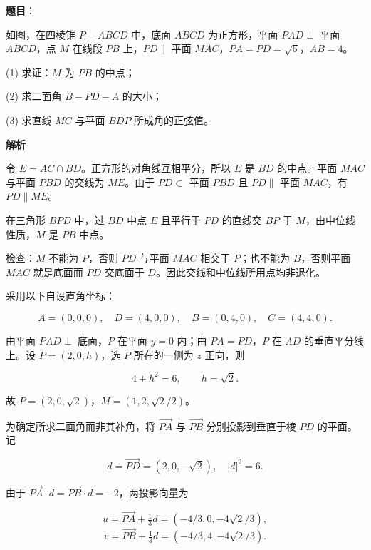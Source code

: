 \begin{answer}

\textbf{题目}：

如图，在四棱锥 $P-ABCD$ 中，底面 $ABCD$ 为正方形，平面 $PAD\perp$ 平面 $ABCD$，点 $M$ 在线段 $PB$ 上，$PD\parallel$ 平面 $MAC$，$PA=PD=\sqrt6$，$AB=4$。

(1) 求证：$M$ 为 $PB$ 的中点；

(2) 求二面角 $B-PD-A$ 的大小；

(3) 求直线 $MC$ 与平面 $BDP$ 所成角的正弦值。
\nopagebreak[4]
\begin{center}\end{center}
\nopagebreak[4]
\textbf{解析}


令 $E=AC\cap BD$。正方形的对角线互相平分，所以 $E$ 是 $BD$ 的中点。平面 $MAC$ 与平面 $PBD$ 的交线为 $ME$。由于 $PD\subset$ 平面 $PBD$ 且 $PD\parallel$ 平面 $MAC$，有 $PD\parallel ME$。

在三角形 $BPD$ 中，过 $BD$ 中点 $E$ 且平行于 $PD$ 的直线交 $BP$ 于 $M$，由中位线性质，$M$ 是 $PB$ 中点。

检查：$M$ 不能为 $P$，否则 $PD$ 与平面 $MAC$ 相交于 $P$；也不能为 $B$，否则平面 $MAC$ 就是底面而 $PD$ 交底面于 $D$。因此交线和中位线所用点均非退化。


采用以下自设直角坐标：

\nopagebreak[4]
\[A=(0,0,0),\quad D=(4,0,0),\quad B=(0,4,0),\quad C=(4,4,0).\]

由平面 $PAD\perp$ 底面，$P$ 在平面 $y=0$ 内；由 $PA=PD$，$P$ 在 $AD$ 的垂直平分线上。设 $P=(2,0,h)$，选 $P$ 所在的一侧为 $z$ 正向，则

\nopagebreak[4]
\[4+h^2=6,\qquad h=\sqrt2.\]

故 $P=(2,0,\sqrt2)$，$M=(1,2,\sqrt2/2)$。

为确定所求二面角而非其补角，将 $\overrightarrow{PA}$ 与 $\overrightarrow{PB}$ 分别投影到垂直于棱 $PD$ 的平面。记

\nopagebreak[4]
\[d=\overrightarrow{PD}=(2,0,-\sqrt2),\quad |d|^2=6.\]

由于 $\overrightarrow{PA}\cdot d=\overrightarrow{PB}\cdot d=-2$，两投影向量为

\nopagebreak[4]
\[u=\overrightarrow{PA}+\tfrac13d=(-4/3,0,-4\sqrt2/3),\]
\nopagebreak[4]
\[v=\overrightarrow{PB}+\tfrac13d=(-4/3,4,-4\sqrt2/3).\]


\end{answer}
